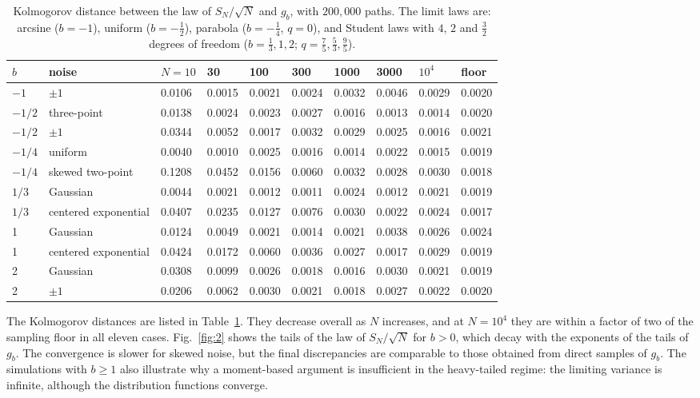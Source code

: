 \documentclass[aip,jmp,preprint,onecolumn,floatfix,superscriptaddress,nofootinbib,11pt]{revtex4-2}
\theoremstyle{plain}
\theoremstyle{remark}
\numberwithin{equation}{section}
\begin{document}
\begin{table}[t]
\caption{Kolmogorov distance between the law of $S_N/\sqrt N$ and $g_b$, with $200{,}000$ paths. The limit laws are: arcsine ($b=-1$), uniform ($b=-\tfrac12$), parabola ($b=-\tfrac14$, $q=0$), and Student laws with $4$, $2$ and $\tfrac32$ degrees of freedom ($b=\tfrac13,1,2$; $q=\tfrac75,\tfrac53,\tfrac95$).}
\label{tab:1}
\centering\small\setlength{\tabcolsep}{4pt}
\begin{tabular}{llllllllll}
\toprule
$b$ & noise & $N=10$ & 30 & 100 & 300 & 1000 & 3000 & $10^{4}$ & floor \\
\midrule
$-1$ & $\pm1$ & 0.0106 & 0.0015 & 0.0021 & 0.0024 & 0.0032 & 0.0046 & 0.0029 & 0.0020 \\
$-1/2$ & three-point & 0.0138 & 0.0024 & 0.0023 & 0.0027 & 0.0016 & 0.0013 & 0.0014 & 0.0020 \\
$-1/2$ & $\pm1$ & 0.0344 & 0.0052 & 0.0017 & 0.0032 & 0.0029 & 0.0025 & 0.0016 & 0.0021 \\
$-1/4$ & uniform & 0.0040 & 0.0010 & 0.0025 & 0.0016 & 0.0014 & 0.0022 & 0.0015 & 0.0019 \\
$-1/4$ & skewed two-point & 0.1208 & 0.0452 & 0.0156 & 0.0060 & 0.0032 & 0.0028 & 0.0030 & 0.0018 \\
$1/3$ & Gaussian & 0.0044 & 0.0021 & 0.0012 & 0.0011 & 0.0024 & 0.0012 & 0.0021 & 0.0019 \\
$1/3$ & centered exponential & 0.0407 & 0.0235 & 0.0127 & 0.0076 & 0.0030 & 0.0022 & 0.0024 & 0.0017 \\
1 & Gaussian & 0.0124 & 0.0049 & 0.0021 & 0.0014 & 0.0021 & 0.0038 & 0.0026 & 0.0024 \\
1 & centered exponential & 0.0424 & 0.0172 & 0.0060 & 0.0036 & 0.0027 & 0.0017 & 0.0029 & 0.0019 \\
2 & Gaussian & 0.0308 & 0.0099 & 0.0026 & 0.0018 & 0.0016 & 0.0030 & 0.0021 & 0.0019 \\
2 & $\pm1$ & 0.0206 & 0.0062 & 0.0030 & 0.0021 & 0.0018 & 0.0027 & 0.0022 & 0.0020 \\
\bottomrule
\end{tabular}
\end{table}
 
The Kolmogorov distances are listed in Table~\ref{tab:1}. They decrease overall as $N$ increases, and at $N=10^{4}$ they are within a factor of two of the sampling floor in all eleven cases. Fig.~\ref{fig:2} shows the tails of the law of $S_N/\sqrt N$ for $b>0$, which decay with the exponents of the tails of $g_b$. The convergence is slower for skewed noise, but the final discrepancies are comparable to those obtained from direct samples of $g_b$. The simulations with $b\ge1$ also illustrate why a moment-based argument is insufficient in the heavy-tailed regime: the limiting variance is infinite, although the distribution functions converge.
 
\end{document}

